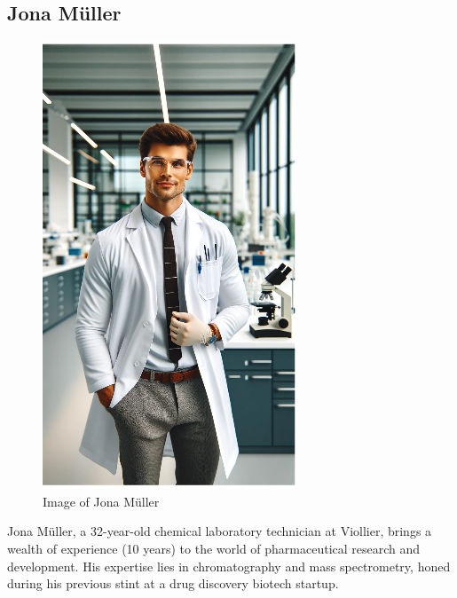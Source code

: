 \subsection{Jona Müller}
\begin{figure}
  \centering
  \vspace{-1.4em}
  \includegraphics[width=0.9\linewidth]{./images/jona.png}
  \caption[Image of Jona Müller, generated by gpt-4-turbo]{Image of Jona Müller}
\end{figure}\leavevmode
Jona Müller, a 32-year-old chemical laboratory technician at Viollier, brings a wealth of experience (10 years) to the world of pharmaceutical research and development. His expertise lies in chromatography and mass spectrometry, honed during his previous stint at a drug discovery biotech startup.
